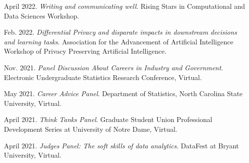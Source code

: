 \begin{etaremune}[topsep=0pt, itemsep=4pt, partopsep=0pt, parsep=0pt]
    \item April 2022. \textit{Writing and communicating well}. Rising Stars in Computational and Data Sciences Workshop.

    \item Feb. 2022. \textit{Differential Privacy and disparate impacts in downstream decisions and learning tasks}. Association for the Advancement of Artificial Intelligence Workshop of Privacy Preserving Artificial Intelligence.
    
    \item Nov. 2021. \textit{Panel Discussion About Careers in Industry and Government}. Electronic Undergraduate Statistics Research Conference, Virtual.

    \item May 2021. \textit{Career Advice Panel}. Department of Statistics, North Carolina State University, Virtual.
    
    \item April 2021. \textit{Think Tanks Panel}. Graduate Student Union Professional Development Series at University of Notre Dame, Virtual.
    
    \item April 2021. \textit{Judges Panel: The soft skills of data analytics}. DataFest at Bryant University, Virtual.
\end{etaremune}
